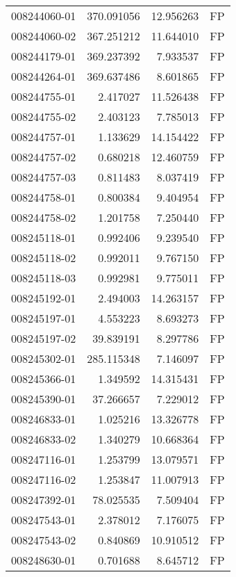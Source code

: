 \begin{tabular}{lrrl}
008244060-01 &  370.091056 &      12.956263 &   FP \\
008244060-02 &  367.251212 &      11.644010 &   FP \\
008244179-01 &  369.237392 &       7.933537 &   FP \\
008244264-01 &  369.637486 &       8.601865 &   FP \\
008244755-01 &    2.417027 &      11.526438 &   FP \\
008244755-02 &    2.403123 &       7.785013 &   FP \\
008244757-01 &    1.133629 &      14.154422 &   FP \\
008244757-02 &    0.680218 &      12.460759 &   FP \\
008244757-03 &    0.811483 &       8.037419 &   FP \\
008244758-01 &    0.800384 &       9.404954 &   FP \\
008244758-02 &    1.201758 &       7.250440 &   FP \\
008245118-01 &    0.992406 &       9.239540 &   FP \\
008245118-02 &    0.992011 &       9.767150 &   FP \\
008245118-03 &    0.992981 &       9.775011 &   FP \\
008245192-01 &    2.494003 &      14.263157 &   FP \\
008245197-01 &    4.553223 &       8.693273 &   FP \\
008245197-02 &   39.839191 &       8.297786 &   FP \\
008245302-01 &  285.115348 &       7.146097 &   FP \\
008245366-01 &    1.349592 &      14.315431 &   FP \\
008245390-01 &   37.266657 &       7.229012 &   FP \\
008246833-01 &    1.025216 &      13.326778 &   FP \\
008246833-02 &    1.340279 &      10.668364 &   FP \\
008247116-01 &    1.253799 &      13.079571 &   FP \\
008247116-02 &    1.253847 &      11.007913 &   FP \\
008247392-01 &   78.025535 &       7.509404 &   FP \\
008247543-01 &    2.378012 &       7.176075 &   FP \\
008247543-02 &    0.840869 &      10.910512 &   FP \\
008248630-01 &    0.701688 &       8.645712 &   FP \\

\end{tabular}
